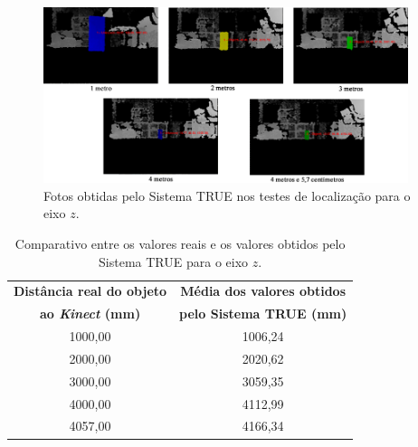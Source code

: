 
	\begin{figure}[htb]
		\begin{center}
			\includegraphics[width=0.95\textwidth]{figuras/5.Testes/eixoz-imgs2.png}
		\end{center}
		\caption{Fotos obtidas pelo Sistema TRUE nos testes de localização para o eixo $\displaystyle z$.}
		\label{fig:distancias}
	\end{figure}

	\begin{table}[h]
		\begin{center}
			\caption{Comparativo entre os valores reais e os valores obtidos pelo Sistema
			TRUE para o eixo $\displaystyle z$.}
			\label{tab:valores-z}
			\begin{tabular}{|c|c|}
				\hline \bf Distância real do objeto & \bf Média dos valores obtidos\\
							 \bf ao \textit{Kinect} (mm) & \bf pelo Sistema TRUE (mm)\\

				\hline
				\hline 1000,00 & 1006,24 \\ %
				\hline 2000,00 & 2020,62 \\ %
				\hline 3000,00 & 3059,35 \\ %
				\hline 4000,00 & 4112,99 \\ %
				\hline 4057,00 & 4166,34 \\ %
				\hline
			\end{tabular}
		\end{center}
	\end{table}

